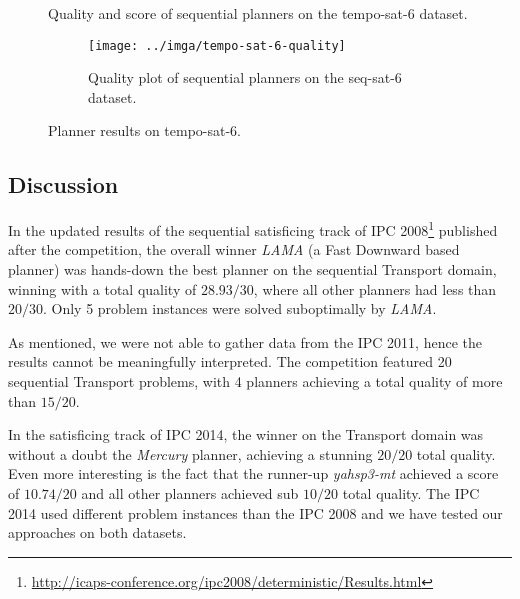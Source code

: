 \begin{figure}
\centering
\begin{subtable}{\textwidth}
\centering

\caption{Quality and score of sequential planners on the tempo-sat-6 dataset.}
\label{tab:tempo-sat-6-ipc-scores}
\end{subtable}
\quad
\begin{subfigure}{\textwidth}
\centering
\texttt{[image: ../imga/tempo-sat-6-quality]}
\caption{Quality plot of sequential planners on the seq-sat-6 dataset.}
\label{fig:tempo-sat-6-quality}
\end{subfigure}
\caption{Planner results on tempo-sat-6.}
\label{fig:tempo-sat-6-results}
\end{figure}


\subsection{Discussion}

In the updated results of the sequential satisficing track of IPC 2008\footnote{\url{http://icaps-conference.org/ipc2008/deterministic/Results.html}} published after the competition,
the overall winner \textit{LAMA} (a Fast Downward based planner)
was hands-down the best planner on the sequential Transport domain, winning
with a total quality of $28.93/30$, where all other planners had less than $20/30$.
Only 5 problem instances were solved suboptimally by \textit{LAMA}.

As mentioned, we were not able to gather data from the IPC 2011,
hence the results cannot be meaningfully interpreted.
The competition featured 20 sequential Transport problems,
with 4 planners achieving a total quality of more than $15/20$.

In the satisficing track of IPC 2014, the winner on the Transport domain
was without a doubt the \textit{Mercury} planner, achieving
a stunning $20/20$ total quality. Even more interesting is the fact that
the runner-up \textit{yahsp3-mt} achieved a score of $10.74/20$
and all other planners achieved sub $10/20$ total quality.
The IPC 2014 used different problem instances than the IPC 2008
and we have tested our approaches on both datasets.

 















